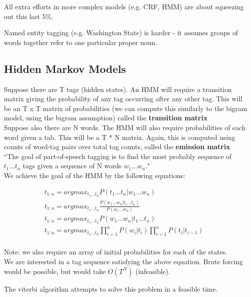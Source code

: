 \documentclass[]{article}
\begin{document}
	All extra efforts in more complex models (e.g. CRF, HMM) are about squeezing out this last 5\%. 
	
	Named entity tagging (e.g. Washington State) is harder - it assumes groups of words together refer to one particular proper noun. 
	
	\subsection{Hidden Markov Models}
	Suppose there are T tags (hidden states). An HMM will require a transition matrix giving the probability of any tag occurring after any other tag. This will be an T x T matrix of probabilities (we can compute this similarly to the bigram model, using the bigram assumption) called the \textbf{transition matrix}
	\\
	Suppose also there are N words. The HMM will also require probabilities of each word given a tab. This will be a T * N matrix. Again, this is computed using counts of word-tag pairs over total tag counts, called the \textbf{emission matrix}
	\\
	``The goal of part-of-speech tagging is to find the most probably sequence of $t_1...t_n$ tags given a sequence of N words $w_1...w_n$."  
	\\
	We achieve the goal of the HMM by the following equations:
	
	\begin{align}	
		t_{1:n} = argmax_{t_1...t_n} P(t_1...t_n | w_1...w_n) &\tag*{max prb tags given words} \\	
		t_{1:n} = argmax_{t_1...t_n} \frac{P(w_1...w_n | t_1...t_n)}{P(w_1...w_n)} &\tag*{by bayes rule} \\	
		t_{1:n} = argmax_{t_1...t_n} P(w_1...w_n | t_1...t_n) &\tag*{since argmax, can discard denom} \\	
		t_{1:n} = argmax_{t_1...t_n} \prod_{i=1}^n P(w_i|t_i) \prod_{i=1}^n P(t_i|t_{i-1}) &\tag*{by the HMM assumptions} \\	
	\end{align}
	
	Note: we also require an array of initial probabilities for each of the states. \\
	
	We are interested in a tag sequence satisfying the above equation. Brute forcing would be possible, but would take $O(T^N)$ (infeasible). 
	
	The viterbi algorithm attempts to solve this problem in a feasible time.
	
\end{document}
